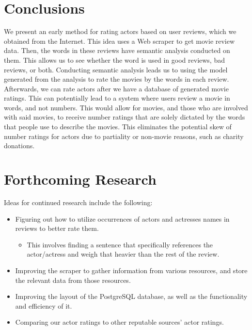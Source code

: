 \documentclass[a0,portrait]{a0poster}
\begin{document}
\begin{multicols}{2}

\color{SaddleBrown} %

\section*{Conclusions}

We present an early method for rating actors based on user reviews, which we obtained from the Internet.  This idea uses a Web scraper to get movie review data.  Then, the words in these reviews have semantic analysis conducted on them.  This allows us to see whether the word is used in good reviews, bad reviews, or both.  Conducting semantic analysis leads us to using the model generated from the analysis to rate the movies by the words in each review.  Afterwards, we can rate actors after we have a database of generated movie ratings.  This can potentially lead to a system where users review a movie in words, and not numbers.  This would allow for movies, and those who are involved with said movies, to receive number ratings that are solely dictated by the words that people use to describe the movies.  This eliminates the potential skew of number ratings for actors due to partiality or non-movie reasons, such as charity donations.



\color{DarkSlateGray} %


\section*{Forthcoming Research}

Ideas for continued research include the following:
\begin{itemize}
\item Figuring out how to utilize occurrences of actors and actresses names in reviews to better rate them.
\begin{itemize}
\item This involves finding a sentence that specifically references the actor/actress and weigh that heavier than the rest of the review.
\end{itemize}
\item Improving the scraper to gather information from various resources, and store the relevant data from those resources.
\item Improving the layout of the PostgreSQL database, as well as the functionality and efficiency of it.
\item Comparing our actor ratings to other reputable sources’ actor ratings.
\end{itemize}


\end{multicols}
\end{document}
